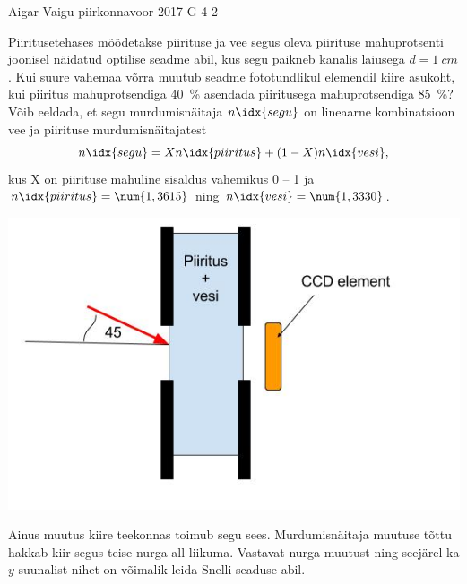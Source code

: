 {Aigar Vaigu} %
{piirkonnavoor} %
{2017} %
{G 4} %
{2} %
{
\ifStatement
Piiritusetehases mõõdetakse piirituse ja vee segus oleva piirituse mahuprotsenti joonisel näidatud optilise seadme abil, kus segu paikneb kanalis laiusega $d=\SI{1}{cm}$. 
Kui suure vahemaa võrra muutub seadme fototundlikul elemendil kiire asukoht, kui piiritus mahuprotsendiga \SI{40}{\percent} asendada piiritusega mahuprotsendiga \SI{85}{\percent}?
Võib eeldada, et segu murdumisnäitaja $n\idx{segu}$ on lineaarne kombinatsioon vee ja piirituse murdumisnäitajatest
$$
n\idx{segu}=Xn\idx{piiritus}+(1-X)n\idx{vesi},
$$
kus X on piirituse mahuline sisaldus vahemikus 0 -- 1 ja $n\idx{piiritus}=\num{1,3615}$ ning $n\idx{vesi}=\num{1,3330}$.

\begin{center}
	\vspace{-0pt}
	\includegraphics[width=0.5\linewidth]{2017-v2g-04-Piiritusetehas.jpg}
	\vspace{-10pt}
\end{center}
\fi


\ifHint
Ainus muutus kiire teekonnas toimub segu sees. Murdumisnäitaja muutuse tõttu hakkab kiir segus teise nurga all liikuma. Vastavat nurga muutust ning seejärel ka $y$-suunalist nihet on võimalik leida Snelli seaduse abil.
\fi


}
